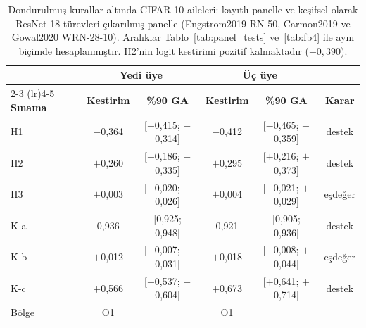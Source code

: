 \begin{table}[!t]
\centering
\caption{Dondurulmuş kurallar altında CIFAR-10 aileleri: kayıtlı panelle ve keşifsel olarak ResNet-18 türevleri çıkarılmış panelle (Engstrom2019 RN-50, Carmon2019 ve Gowal2020 WRN-28-10). Aralıklar Tablo~\ref{tab:panel_tests} ve~\ref{tab:fb4} ile aynı biçimde hesaplanmıştır. H2'nin logit kestirimi pozitif kalmaktadır ($+0{,}390$).}
\label{tab:reduced_panel}
\scriptsize
\setlength{\tabcolsep}{1.6pt}
\begin{tabular}{lccccc}
\toprule
& \multicolumn{2}{c}{\textbf{Yedi üye}} & \multicolumn{2}{c}{\textbf{Üç üye}} & \\
\cmidrule(lr){2-3} \cmidrule(lr){4-5}
\textbf{Sınama} & \textbf{Kestirim} & \textbf{\%90 GA} & \textbf{Kestirim} & \textbf{\%90 GA} & \textbf{Karar} \\
\midrule
H1 & $-$0,364 & [$-$0,415; $-$0,314] & $-$0,412 & [$-$0,465; $-$0,359] & destek \\
H2 & $+$0,260 & [$+$0,186; $+$0,335] & $+$0,295 & [$+$0,216; $+$0,373] & destek \\
H3 & $+$0,003 & [$-$0,020; $+$0,026] & $+$0,004 & [$-$0,021; $+$0,029] & eşdeğer \\
K-a & 0,936 & [0,925; 0,948] & 0,921 & [0,905; 0,936] & destek \\
K-b & $+$0,012 & [$-$0,007; $+$0,031] & $+$0,018 & [$-$0,008; $+$0,044] & eşdeğer \\
K-c & $+$0,566 & [$+$0,537; $+$0,604] & $+$0,673 & [$+$0,641; $+$0,714] & destek \\
Bölge & O1 & & O1 & & \\
\bottomrule
\end{tabular}
\end{table}
